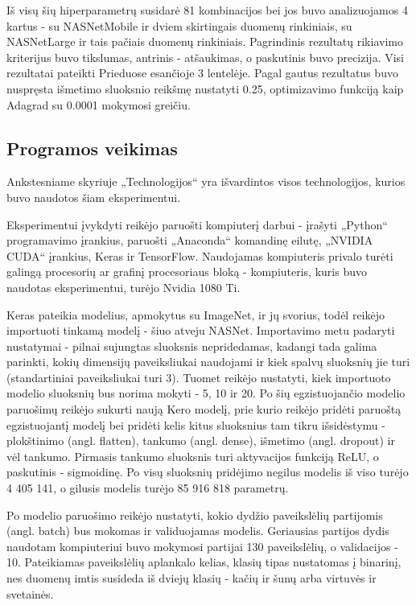 \documentclass{VUMIFPSbakalaurinis}
\begin{document}
Iš visų šių hiperparametrų susidarė 81 kombinacijos bei jos buvo analizuojamos 4 kartus - su NASNetMobile ir dviem skirtingais duomenų rinkiniais, su NASNetLarge ir tais pačiais duomenų rinkiniais.
Pagrindinis rezultatų rikiavimo kriterijus buvo tikslumas, antrinis - atšaukimas, o paskutinis buvo precizija. Visi rezultatai pateikti Prieduose esančioje 3 lentelėje. 
Pagal gautus rezultatus buvo nuspręsta išmetimo sluoksnio reikšmę nustatyti 0.25, optimizavimo funkciją kaip Adagrad su 0.0001 mokymosi greičiu.


\subsection{Programos veikimas}
Ankstesniame skyriuje „Technologijos“ yra išvardintos visos technologijos, kurios buvo naudotos šiam eksperimentui.

Eksperimentui įvykdyti reikėjo paruošti kompiuterį darbui - įrašyti „Python“ programavimo įrankius, paruošti „Anaconda“ komandinę eilutę, „NVIDIA CUDA“ įrankius, Keras ir 
TensorFlow. Naudojamas kompiuteris privalo turėti galingą procesorių ar grafinį procesoriaus bloką - kompiuteris, kuris buvo naudotas eksperimentui, turėjo Nvidia 1080 Ti. 
 
Keras pateikia modelius, apmokytus su ImageNet, ir jų svorius, todėl reikėjo importuoti 
tinkamą modelį - šiuo atveju NASNet. Importavimo metu padaryti nustatymai - pilnai sujungtas sluoksnis nepridedamas, kadangi tada galima parinkti, kokių dimensijų 
paveiksliukai naudojami ir kiek spalvų sluoksnių jie turi (standartiniai paveiksliukai turi 3). Tuomet reikėjo nustatyti, kiek importuoto modelio sluoksnių bus norima mokyti - 5, 10 ir 20. 
Po šių egzistuojančio modelio paruošimų reikėjo sukurti naują Kero modelį, prie kurio reikėjo pridėti paruoštą egzistuojantį modelį bei pridėti kelis kitus sluoksnius tam tikru išsidėstymu - 
plokštinimo (angl. flatten), tankumo (angl. dense), išmetimo (angl. dropout) ir vėl tankumo. Pirmasis tankumo sluoksnis turi aktyvacijos funkciją ReLU, o paskutinis - sigmoidinę. 
Po visų sluoksnių pridėjimo negilus modelis iš viso turėjo 4 405 141, o gilusis modelis turėjo 85 916 818 parametrų.

Po modelio paruošimo reikėjo nustatyti, kokio dydžio paveikslėlių partijomis (angl. batch) bus mokomas ir validuojamas modelis. Geriausias partijos dydis naudotam kompiuteriui buvo mokymosi partijai 130 paveikslėlių, o validacijos - 10.
Pateikiamas paveikslėlių aplankalo kelias, klasių tipas nustatomas į binarinį, nes duomenų imtis susideda iš dviejų klasių - kačių ir šunų arba virtuvės ir svetainės.
\end{document}
